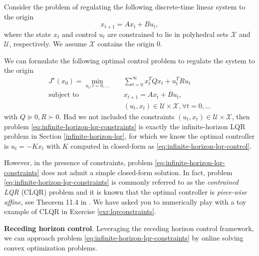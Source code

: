 \documentclass[
]{book}
\theoremstyle{definition}
\theoremstyle{definition}
\theoremstyle{definition}
\theoremstyle{definition}
\theoremstyle{remark}
\begin{document}
Consider the problem of regulating the following discrete-time linear system to the origin
\begin{equation}
x_{t+1} = A x_t + B u_t,
\label{eq:mpc-linear-system}
\end{equation}
where the state \(x_t\) and control \(u_t\) are constrained to lie in polyhedral sets \(\mathcal{X}\) and \(\mathcal{U}\), respectively.
We assume \(\mathcal{X}\) contains the origin \(0\).

We can formulate the following optimal control problem to regulate the system to the origin
\begin{equation}
\begin{split}
J^\star(x_0) = \min_{u_t,t=0,\dots} & \quad \sum_{t=0}^{\infty} x_t^T Q x_t + u_t^T R u_t \\
\text{subject to} & \quad x_{t+1} = A x_t + B u_t, \\
& \quad (u_t,x_t) \in \mathcal{U} \times \mathcal{X}, \forall t = 0,\dots
\end{split}
\label{eq:infinite-horizon-lqr-constraints}
\end{equation}
with \(Q \succeq 0, R \succ 0\).
Had we not included the constraints \((u_t,x_t) \in \mathcal{U} \times \mathcal{X}\), then problem \eqref{eq:infinite-horizon-lqr-constraints} is exactly the infinite-horizon LQR problem in Section \ref{infinite-horizon-lqr}, for which we know the optimal controller is \(u_t = - K x_t\) with \(K\) computed in closed-form as \eqref{eq:infinite-horizon-lqr-control}.

However, in the presence of constraints, problem \eqref{eq:infinite-horizon-lqr-constraints} does not admit a simple closed-form solution. In fact, problem \eqref{eq:infinite-horizon-lqr-constraints} is commonly referred to as the \emph{contrained LQR} (CLQR) problem and it is known that the optimal controller is \emph{piece-wise affine}, see Theorem 11.4 in \citep{borrelli17book-mpc}. We have asked you to numerically play with a toy example of CLQR in Exercise \ref{exr:lqrconstraints}.

\textbf{Receding horizon control}. Leveraging the receding horizon control framework, we can approach problem \eqref{eq:infinite-horizon-lqr-constraints} by online solving convex optimization problems.
\end{document}
